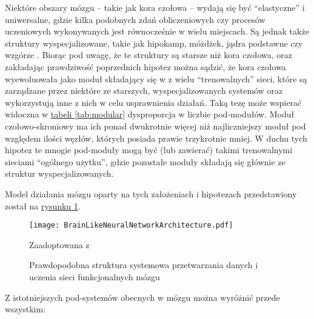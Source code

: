 Niektóre obszary mózgu -- takie jak kora czołowa -- wydają się być ``elastyczne'' i uniwersalne, gdzie kilka podobnych zdań obliczeniowych czy procesów uczeniowych wykonywanych jest równocześnie w wielu miejscach.
Są jednak także struktury wyspecjalizowane, takie jak hipokamp, móżdżek, jądra podstawne czy wzgórze \cite{solari2011cognitive}.
Biorąc pod uwagę, że te struktury są starsze niż kora czołowa, oraz zakładając prawdziwość poprzednich hipotez można sądzić, że kora czołowa wyewoluowała jako  moduł składający się w z wielu ``trenowalnych'' sieci, które są zarządzane przez niektóre ze starszych, wyspecjalizowanych systemów oraz wykorzystują inne z nich w celu usprawnienia działań.
Taką tezę może wspierać widoczna w \hyperref[tab:modular]{tabeli \ref*{tab:modular}} dysproporcja w liczbie pod-modułów.
Moduł czołowo-skroniowy ma ich ponad dwukrotnie więcej niż najliczniejszy moduł pod względem ilości węzłów, których posiada prawie trzykrotnie mniej.
W duchu tych hipotez te mnogie pod-moduły mogą być (lub zawierać) takimi trenowalnymi sieciami ``ogólnego użytku'', gdzie pozostałe moduły składają się głównie ze struktur wyspecjalizowanych.

Model działania mózgu oparty na tych założeniach i hipotezach przedstawiony został na \hyperref[fig:structure-with-specialized-systems]{rysunku \ref*{fig:structure-with-specialized-systems}}.

\begin{figure}[ht]
	\texttt{[image: BrainLikeNeuralNetworkArchitecture.pdf]}
	\caption{Prawdopodobna struktura systemowa przetwarzania danych i uczenia sieci funkcjonalnych mózgu}
	Zaadoptowana z \cite{marblestone2016toward}
	\label{fig:structure-with-specialized-systems}
\end{figure}

Z istotniejszych pod-systemów obecnych w mózgu można wyróżnić przede wszystkim:

